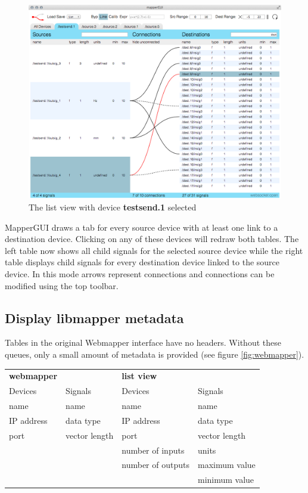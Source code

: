 \begin{figure}[ht]
\centering
	\includegraphics[width=1\textwidth]{figures/list_view_single_link}
\caption{The list view with device \textbf{testsend.1} selected}
\label{fig:list_view_single_link}
\end{figure}

MapperGUI draws a tab for every source device with at least one link to a destination device. Clicking on any of these devices will redraw both tables. The left table now shows all child signals for the selected source device while the right table displays child signals for every destination device linked to the source device. In this mode arrows represent connections and connections can be modified using the top toolbar.

	
	\subsection{Display libmapper metadata} %
	\label{sub:display_libmapper_metadata}

Tables in the original Webmapper interface have no headers. Without these queues, only a small amount of metadata is provided (see figure \ref{fig:webmapper}).

\begin{table}
	\centering
	\label{tab:webmapper_list_view_metadata}
		\begin{tabular}{l  l  |  l l }
		\hline\hline
		\textbf{webmapper}&&\textbf{list view}\\
		Devices&Signals&Devices&Signals\\
		\hline
		name&name&name&name\\
		IP address&data type&IP address&data type\\
		port&vector length&port&vector length\\
		&&number of inputs&units\\
		&&number of outputs&maximum value\\
		&&&minimum value\\
		\end{tabular}
\end{table}

